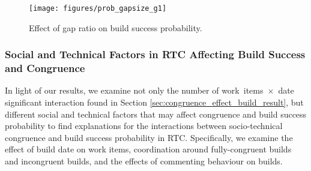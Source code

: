 \begin{figure}[t]
	\centering
	\texttt{[image: figures/prob\_gapsize\_g1]}
	\caption{Effect of gap ratio on build success probability. }
	\label{fig:prob_gapsize_a}
\end{figure}




\subsubsection{Social and Technical Factors in RTC Affecting Build Success and Congruence}
\label{sec:otherfactors}
In light of our results, we examine not only the number of work~items~$\times$~date significant interaction found in Section \ref{sec:congruence_effect_build_result}, but different social and technical factors that may affect congruence
and build success probability to find explanations for the interactions between socio-technical congruence and build success probability in RTC.
Specifically, we examine the effect of build date on work items, coordination around fully-congruent builds and
incongruent builds, and the effects of commenting behaviour on builds.

